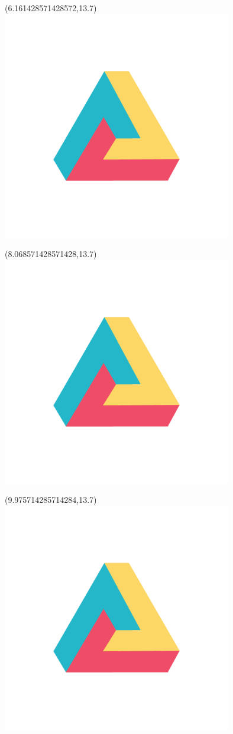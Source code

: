 \documentclass[22pt]{beamer}
\begin{document}
\begin{frame}[fragile]
\begin{textblock}{2}
\end{textblock}
\begin{textblock}{2}(6.161428571428572,13.7)
\includegraphics[height=10cm]{dh.png}
\end{textblock}
\begin{textblock}{2}(8.068571428571428,13.7)
\includegraphics[height=10cm]{dh.png}
\end{textblock}
\begin{textblock}{2}(9.975714285714284,13.7)
\includegraphics[height=10cm]{dh.png}

\end{textblock}
\end{frame}
\end{document}
